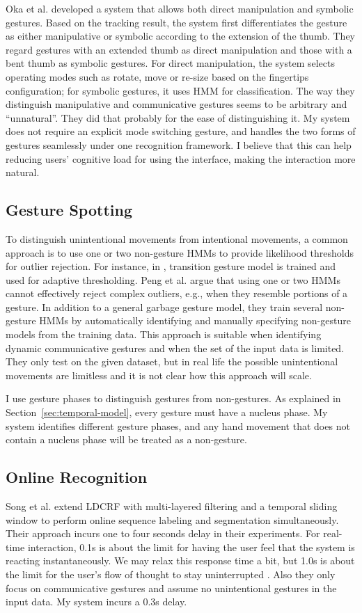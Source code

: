 Oka et al. \cite{Oka02} developed a system that
allows both direct manipulation and symbolic gestures. Based on the tracking
result, the system first differentiates the gesture as either manipulative or symbolic 
according to the extension of the thumb. They regard gestures with an extended 
thumb as direct manipulation and those with a bent thumb as symbolic gestures. 
For direct manipulation, the system selects operating modes such as rotate, 
move or re-size based on the fingertips configuration; for symbolic gestures, it 
uses HMM for classification. The way they distinguish manipulative and 
communicative gestures seems to be arbitrary and ``unnatural''. They did that 
probably for the ease of distinguishing it.
My system does not
require an explicit mode switching gesture, and handles the two forms of
gestures seamlessly under one recognition framework. I believe that this can
help reducing users' cognitive load for using the interface, making the interaction more natural.

\subsection{Gesture Spotting}
To distinguish unintentional movements from intentional
movements, a common approach is to use one or two non-gesture HMMs to
provide likelihood thresholds for outlier rejection. For instance, in \cite{yang07}, 
transition gesture model is trained and used for adaptive thresholding.
Peng et al. \cite{peng11} argue that using one or two HMMs cannot
effectively reject complex outliers, e.g., when they resemble portions of a
gesture. In addition to a general garbage gesture model, they train several
non-gesture HMMs by automatically identifying and manually specifying
non-gesture models from the training data. This approach is suitable when
identifying dynamic communicative gestures and when the set of the input data is limited. They only test on the
given dataset, but in real life the possible unintentional movements are
limitless and it is not clear how this approach will scale. 

I use gesture phases to distinguish gestures from non-gestures. As explained in
Section~\ref{sec:temporal-model}, every gesture must have a nucleus phase.
My system identifies different gesture phases, and any hand movement that does
not contain a nucleus phase will be treated as a non-gesture.

\subsection{Online Recognition}
Song et al. \cite{song12} extend LDCRF with multi-layered
filtering and a temporal sliding window to perform online sequence labeling and
segmentation simultaneously.
Their approach incurs one to four seconds delay in their
experiments. For real-time interaction, 0.1s is about the limit for having the
user feel that the system is reacting instantaneously. We may relax this response time a
bit, but 1.0s is about the limit for the user's flow of thought to stay
uninterrupted \cite{card91}.  Also they only focus on communicative
gestures and assume no unintentional gestures in the input data. My system
incurs a 0.3s delay.


